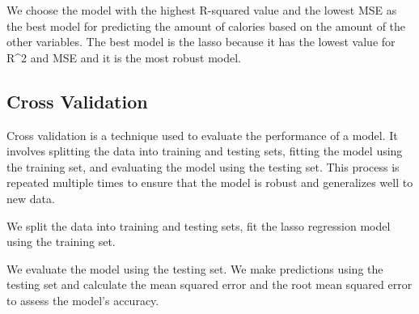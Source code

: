 \documentclass[
]{article}
\newenvironment{Shaded}{\begin{snugshade}}{\end{snugshade}}
\newcommand{\AttributeTok}[1]{\textcolor[rgb]{0.13,0.29,0.53}{#1}}
\newcommand{\CommentTok}[1]{\textcolor[rgb]{0.56,0.35,0.01}{\textit{#1}}}
\newcommand{\ConstantTok}[1]{\textcolor[rgb]{0.56,0.35,0.01}{#1}}
\newcommand{\DecValTok}[1]{\textcolor[rgb]{0.00,0.00,0.81}{#1}}
\newcommand{\FloatTok}[1]{\textcolor[rgb]{0.00,0.00,0.81}{#1}}
\newcommand{\FunctionTok}[1]{\textcolor[rgb]{0.13,0.29,0.53}{\textbf{#1}}}
\newcommand{\NormalTok}[1]{#1}
\newcommand{\OtherTok}[1]{\textcolor[rgb]{0.56,0.35,0.01}{#1}}
\newcommand{\SpecialCharTok}[1]{\textcolor[rgb]{0.81,0.36,0.00}{\textbf{#1}}}
\begin{document}
We choose the model with the highest R-squared value and the lowest MSE
as the best model for predicting the amount of calories based on the
amount of the other variables. The best model is the lasso because it
has the lowest value for R\^{}2 and MSE and it is the most robust model.

\subsection{Cross Validation}\label{cross-validation}

Cross validation is a technique used to evaluate the performance of a
model. It involves splitting the data into training and testing sets,
fitting the model using the training set, and evaluating the model using
the testing set. This process is repeated multiple times to ensure that
the model is robust and generalizes well to new data.

We split the data into training and testing sets, fit the lasso
regression model using the training set.

\begin{Shaded}
\end{Shaded}

We evaluate the model using the testing set. We make predictions using
the testing set and calculate the mean squared error and the root mean
squared error to assess the model's accuracy.
\end{document}
